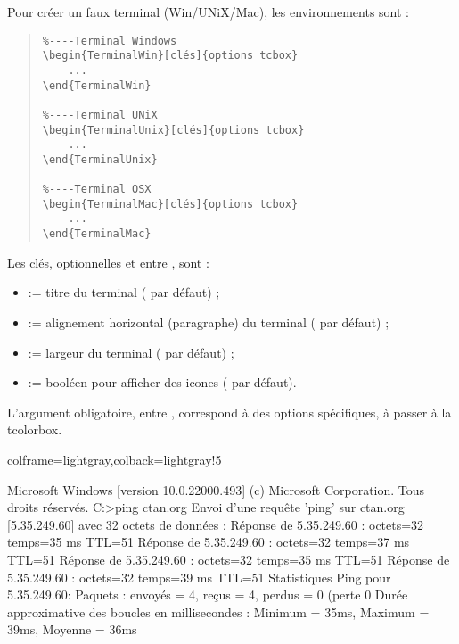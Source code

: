 \documentclass[11pt,a4paper]{ltxdoc}
\begin{document}
Pour créer un \og faux \fg{} terminal (Win/UNiX/Mac), les environnements sont :

\begin{quote}
\begin{verbatim}
%----Terminal Windows
\begin{TerminalWin}[clés]{options tcbox}
    ...
\end{TerminalWin}

%----Terminal UNiX
\begin{TerminalUnix}[clés]{options tcbox}
    ...
\end{TerminalUnix}

%----Terminal OSX
\begin{TerminalMac}[clés]{options tcbox}
    ...
\end{TerminalMac}
\end{verbatim}
\end{quote}

Les \textsf{clés}, optionnelles et entre \MontreCode{[...]}, sont :

\begin{itemize}
	\item {} := titre du terminal ( par défaut) ;
	\item {} := alignement horizontal (paragraphe) du terminal ( par défaut) ;
	\item {} := largeur du terminal ( par défaut) ;
	\item {} := booléen pour afficher des icones ( par défaut).
\end{itemize}

\medskip

L'argument obligatoire, entre , correspond à des options spécifiques, à passer à la \textsf{tcolorbox}.

\begin{tcblisting}{colframe=lightgray,colback=lightgray!5}
\begin{TerminalWin}{}
Microsoft Windows [version 10.0.22000.493]
(c) Microsoft Corporation. Tous droits réservés.
C:\Users\test>ping ctan.org
Envoi d'une requête 'ping' sur ctan.org [5.35.249.60] avec 32 octets de données :
Réponse de 5.35.249.60 : octets=32 temps=35 ms TTL=51
Réponse de 5.35.249.60 : octets=32 temps=37 ms TTL=51
Réponse de 5.35.249.60 : octets=32 temps=35 ms TTL=51
Réponse de 5.35.249.60 : octets=32 temps=39 ms TTL=51
Statistiques Ping pour 5.35.249.60:
Paquets : envoyés = 4, reçus = 4, perdus = 0 (perte 0%
Durée approximative des boucles en millisecondes :
Minimum = 35ms, Maximum = 39ms, Moyenne = 36ms
\end{TerminalWin}
\end{tcblisting}
\end{document}
